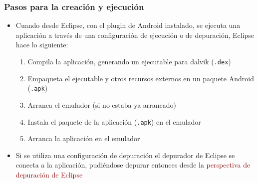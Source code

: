 \documentclass[hyperref={pdfpagelabels=true},utf8x]{beamer}
\newcommand{\res}[1]{\textcolor{darkred}{#1}}
\begin{document}
\begin{frame}[fragile]
 \frametitle{Pasos para la creación y ejecución}

 \begin{itemize}
 \item Cuando desde Eclipse, con el plugin de Android instalado, se
   ejecuta una aplicación a través de una configuración de ejecución o
   de depuración, Eclipse hace lo siguiente:
   \begin{enumerate}
     \item Compila la aplicación, generando un ejecutable para dalvik (\verb|.dex|)
     \item Empaqueta el ejecutable y otros recursos externos en un paquete Android (\verb|.apk|)
     \item Arranca el emulador (si no estaba ya arrancado)
     \item Instala el paquete de la aplicación (\verb|.apk|) en el emulador
     \item Arranca la aplicación en el emulador
   \end{enumerate}

 \item Si se utiliza una configuración de depuración el depurador de
   Eclipse se conecta a la aplicación, pudiéndose depurar entonces
   desde la \res{perspectiva de depuración de Eclipse}

 \end{itemize}

\end{frame}
\end{document}
